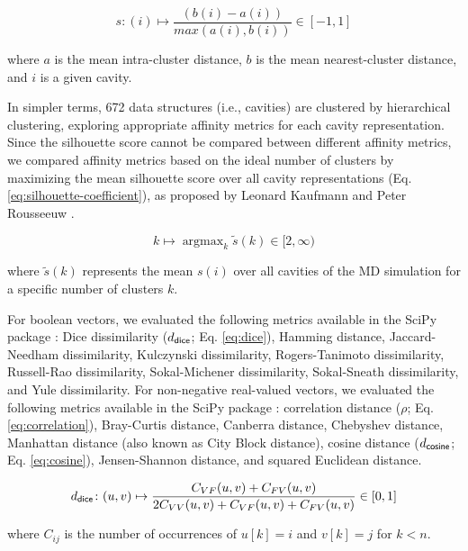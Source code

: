 \documentclass[Ingles]{phdthesis}
\DeclareMathOperator*{\argmax}{argmax}
\def\ie{i.e.\onedot}
\begin{document}
\begin{equation}
  s \colon (i) \mapsto \frac{(b(i) - a(i))}{max(a(i), b(i))} \in [-1, 1]
  \label{eq:silhouette}
\end{equation}

\noindent where $a$ is the mean intra-cluster distance, $b$ is the mean nearest-cluster distance, and $i$ is a given cavity.

In simpler terms, 672 data structures (\ie, cavities) are clustered by hierarchical clustering, exploring appropriate affinity metrics for each cavity representation. Since the silhouette score cannot be compared between different affinity metrics, we compared affinity metrics based on the ideal number of clusters by maximizing the mean silhouette score over all cavity representations (Eq. \ref{eq:silhouette-coefficient}), as proposed by Leonard Kaufmann and Peter Rousseeuw \cite{kaufman1990}.

\begin{equation}
  k \mapsto \argmax_k \tilde{s}(k) \in [2,\infty)
  \label{eq:silhouette-coefficient}
\end{equation}

\noindent where $\tilde{s}(k)$ represents the mean $s(i)$ over all cavities of the \acs{MD} simulation for a specific number of clusters $k$.

For boolean vectors, we evaluated the following metrics available in the SciPy package \cite{scipy}: Dice dissimilarity ($d_{\sf dice}$; Eq. \ref{eq:dice}), Hamming distance, Jaccard-Needham dissimilarity, Kulczynski dissimilarity, Rogers-Tanimoto dissimilarity, Russell-Rao dissimilarity, Sokal-Michener dissimilarity, Sokal-Sneath dissimilarity, and Yule dissimilarity. For non-negative real-valued vectors, we evaluated the following metrics available in the SciPy package \cite{scipy}: correlation distance ($\rho$; Eq. \ref{eq:correlation}), Bray-Curtis distance, Canberra distance, Chebyshev distance, Manhattan distance (also known as City Block distance), cosine distance ($d_{\sf cosine}$; Eq. \ref{eq:cosine}), Jensen-Shannon distance, and squared Euclidean distance.

\begin{equation}
  d_{\sf dice} \colon (u,v) \mapsto \frac{C_{VF}(u,v) + C_{FV}(u,v)}{2 C_{VV}(u,v) + C_{VF}(u,v) + C_{FV}(u,v)} \in [0,1]
  \label{eq:dice}
\end{equation}

\noindent where $C_{ij}$ is the number of occurrences of $u[k] = i$ and $v[k] = j$ for $k<n$.
\end{document}
